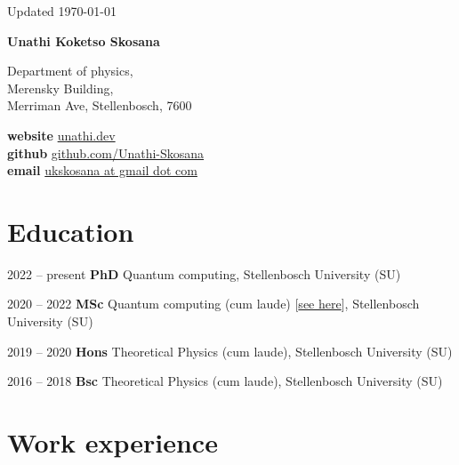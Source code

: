 \documentclass[10pt]{extreport}
\newcommand*{\name}{Unathi Koketso Skosana}
\newcommand{\namefont}[1]{{\normalfont\bfseries\Huge{#1}}}
\begin{document}
\begin{center}
	\vfill
	\small {Updated \monthyeardate\today}
\end{center}

\vspace{2em}

\namefont{\name}

\vspace{1em}

\begin{minipage}[t]{0.45\linewidth}
	Department of physics, \\
	Merensky Building, \\
	Merriman Ave, Stellenbosch, 7600
\end{minipage}
\hfill
\begin{minipage}[t]{0.5\linewidth}
	\textbf{website} \href{https://www.unathi.dev}{unathi.dev} \\
	\textbf{github}  \href{https://www.github.com/Unathi-Skosana}{github.com/Unathi-Skosana}  \\
	\textbf{email} \href{mailto:ukskosana@gmail.com}{ukskosana at gmail dot com} \hfill
\end{minipage}

\section*{Education}

\begin{tablist}
	\item[2022 -- present]     \tab{}\textbf{PhD} Quantum computing, Stellenbosch University (SU)
	\item[2020 -- 2022] \tab{}\textbf{MSc} Quantum computing ({cum laude}) [\href{https://github.com/Unathi-Skosana/mastersthesis}{see here}], Stellenbosch University (SU)
\item[2019 -- 2020]  \tab{}\textbf{Hons} Theoretical Physics ({cum laude}), Stellenbosch University (SU)
\item[2016 -- 2018]  \tab{}\textbf{Bsc} Theoretical Physics ({cum laude}), Stellenbosch University (SU)
\end{tablist}

\section*{Work experience}
\end{document}
